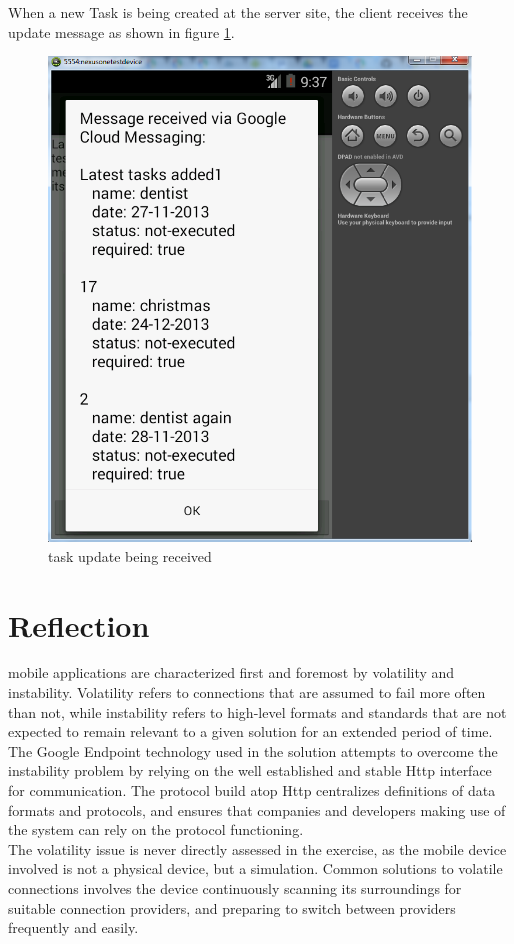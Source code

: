 \pagebreak
When a new Task is being created at the server site, the client receives the update message as shown in figure \ref{mobile_task_update_figure}.
\begin{figure}[H]
	\centering
	\includegraphics[scale=0.7]{images/googlecloud__tasksindevice.png}
	\caption{task update being received}
	\label{mobile_task_update_figure}
\end{figure}


\section{Reflection}

mobile applications are characterized first and foremost by volatility and instability. Volatility refers to connections that are assumed to fail more often than not, while instability refers to high-level formats and standards that are not expected to remain relevant to a given solution for an extended period of time. The Google Endpoint technology used in the solution attempts to overcome the instability problem by relying on the well established and stable Http interface for communication. The protocol build atop Http centralizes definitions of data formats and protocols, and ensures that companies and developers making use of the system can rely on the protocol functioning.\\
The volatility issue is never directly assessed in the exercise, as the mobile device involved is not a physical device, but a simulation. Common solutions to volatile connections involves the device continuously scanning its surroundings for suitable connection providers, and preparing to switch between providers frequently and easily.\\

